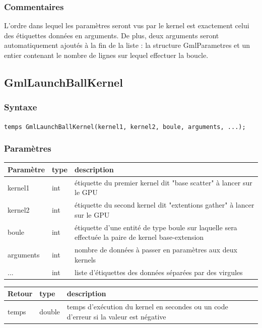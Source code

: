 \documentclass[a4paper,12pt]{article}
\begin{document}
\subsubsection*{Commentaires}
L'ordre dans lequel les paramètres seront vus par le kernel est exactement celui des étiquettes données en arguments. De plus, deux arguments seront automatiquement ajoutés à la fin de la liste : la structure GmlParametres et un entier contenant le nombre de lignes sur lequel effectuer la boucle.

\subsection{GmlLaunchBallKernel}
\subsubsection*{Syntaxe}
{\tt temps GmlLaunchBallKernel(kernel1, kernel2, boule, arguments, ...);}
\subsubsection*{Paramètres}

\begin{tabular}{|m{2cm}|m{1.5cm}|m{10.5cm}|}
\hline
Paramètre  & type   & description \\
\hline
kernel1    & int   & étiquette du premier kernel dit "base scatter" à lancer sur le GPU \\
\hline
kernel2    & int   & étiquette du second kernel dit "extentions gather" à lancer sur le GPU \\
\hline
boule      & int   & étiquette d'une entité de type boule sur laquelle sera effectuée la paire de kernel base-extension \\
\hline
arguments  & int   & nombre de données à passer en paramètres aux deux kernels \\
\hline
...        & int   & liste d'étiquettes des données séparées par des virgules \\
\hline
\end{tabular}

\medskip

\begin{tabular}{|m{2cm}|m{1.5cm}|m{10.5cm}|}
\hline
Retour     & type   & description \\
\hline
temps      & double & temps d'exécution du kernel en secondes ou un code d'erreur si la valeur est négative \\
\hline
\end{tabular}\\
 
\end{document}

